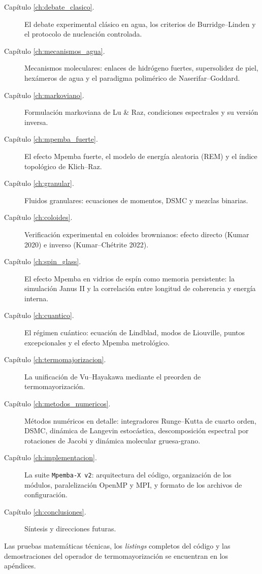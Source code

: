 \begin{description}
\item[Capítulo \ref{ch:debate_clasico}.] El debate experimental clásico en agua, 
los criterios de Burridge--Linden y el protocolo de nucleación controlada.
\item[Capítulo \ref{ch:mecanismos_agua}.] Mecanismos moleculares: enlaces de 
hidrógeno fuertes, supersolidez de piel, hexámeros de agua y el paradigma 
polimérico de Naserifar--Goddard.
\item[Capítulo \ref{ch:markoviano}.] Formulación markoviana de Lu \& Raz, 
condiciones espectrales y su versión inversa.
\item[Capítulo \ref{ch:mpemba_fuerte}.] El efecto Mpemba fuerte, el modelo de 
energía aleatoria (REM) y el índice topológico de Klich--Raz.
\item[Capítulo \ref{ch:granular}.] Fluidos granulares: ecuaciones de momentos, 
DSMC y mezclas binarias.
\item[Capítulo \ref{ch:coloides}.] Verificación experimental en coloides 
brownianos: efecto directo (Kumar 2020) e inverso (Kumar--Chétrite 2022).
\item[Capítulo \ref{ch:spin_glass}.] El efecto Mpemba en vidrios de espín como 
memoria persistente: la simulación Janus II y la correlación entre longitud de 
coherencia y energía interna.
\item[Capítulo \ref{ch:cuantico}.] El régimen cuántico: ecuación de Lindblad, 
modos de Liouville, puntos excepcionales y el efecto Mpemba metrológico.
\item[Capítulo \ref{ch:termomajorizacion}.] La unificación de Vu--Hayakawa 
mediante el preorden de termomayorización.
\item[Capítulo \ref{ch:metodos_numericos}.] Métodos numéricos en detalle: 
integradores Runge--Kutta de cuarto orden, DSMC, dinámica de Langevin estocástica, 
descomposición espectral por rotaciones de Jacobi y dinámica molecular 
gruesa-grano.
\item[Capítulo \ref{ch:implementacion}.] La suite \texttt{Mpemba-X v2}: 
arquitectura del código, organización de los módulos, paralelización OpenMP y 
MPI, y formato de los archivos de configuración.
\item[Capítulo \ref{ch:conclusiones}.] Síntesis y direcciones futuras.
\end{description}

Las pruebas matemáticas técnicas, los \emph{listings} completos del código y las 
demostraciones del operador de termomayorización se encuentran en los apéndices.
